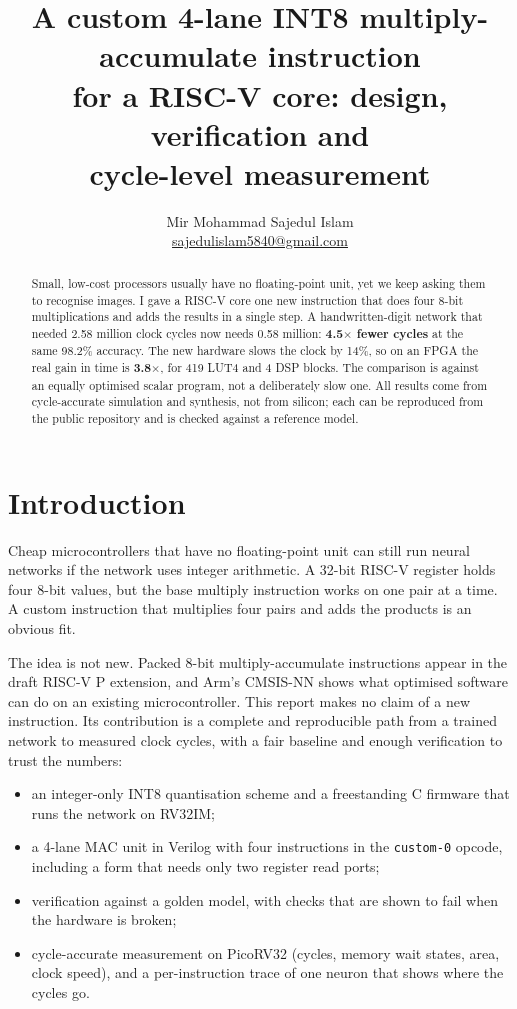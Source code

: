 \documentclass[10pt,a4paper]{article}
\title{\bfseries A custom 4-lane INT8 multiply-accumulate instruction\\for a RISC-V core: design, verification and\\cycle-level measurement}
\author{Mir Mohammad Sajedul Islam\\[2pt]\small\href{mailto:sajedulislam5840@gmail.com}{sajedulislam5840@gmail.com}}
\date{}
\begin{document}
\maketitle

\begin{abstract}
\noindent Small, low-cost processors usually have no floating-point unit, yet we keep asking them to recognise images. I gave a RISC-V core one new instruction that does four 8-bit multiplications and adds the results in a single step. A handwritten-digit network that needed 2.58 million clock cycles now needs 0.58 million: \textbf{4.5$\times$ fewer cycles} at the same 98.2\% accuracy. The new hardware slows the clock by 14\%, so on an FPGA the real gain in time is \textbf{3.8$\times$}, for 419 LUT4 and 4 DSP blocks. The comparison is against an equally optimised scalar program, not a deliberately slow one. All results come from cycle-accurate simulation and synthesis, not from silicon; each can be reproduced from the public repository and is checked against a reference model.
\end{abstract}

\section{Introduction}
Cheap microcontrollers that have no floating-point unit can still run neural networks if the network uses integer arithmetic. A 32-bit RISC-V register holds four 8-bit values, but the base multiply instruction works on one pair at a time. A custom instruction that multiplies four pairs and adds the products is an obvious fit.

The idea is not new. Packed 8-bit multiply-accumulate instructions appear in the draft RISC-V P extension, and Arm's CMSIS-NN shows what optimised software can do on an existing microcontroller. This report makes no claim of a new instruction. Its contribution is a complete and reproducible path from a trained network to measured clock cycles, with a fair baseline and enough verification to trust the numbers:

\begin{itemize}
\item an integer-only INT8 quantisation scheme and a freestanding C firmware that runs the network on RV32IM;
\item a 4-lane MAC unit in Verilog with four instructions in the \texttt{custom-0} opcode, including a form that needs only two register read ports;
\item verification against a golden model, with checks that are shown to fail when the hardware is broken;
\item cycle-accurate measurement on PicoRV32 (cycles, memory wait states, area, clock speed), and a per-instruction trace of one neuron that shows where the cycles go.
\end{itemize}
\end{document}
